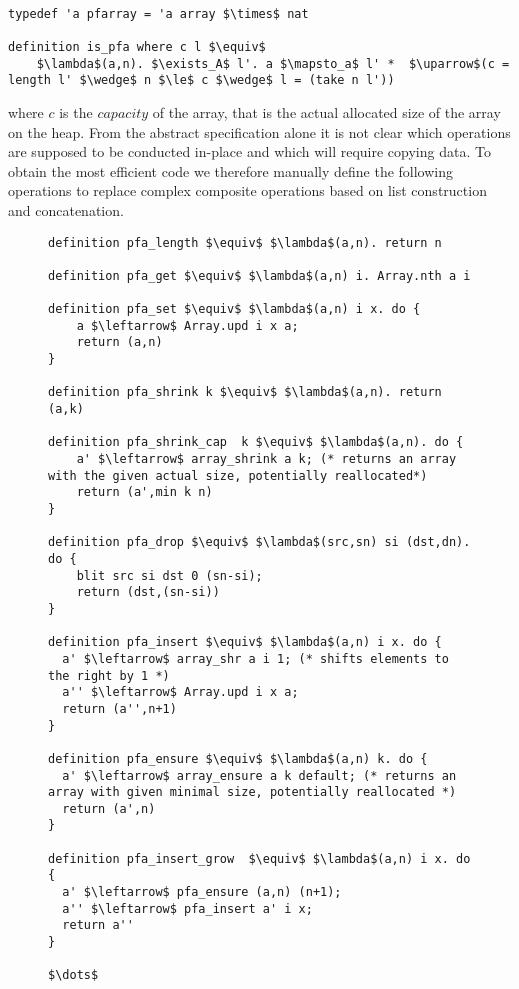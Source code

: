 \begin{lstlisting}[mathescape=true, language=Isabelle]

typedef 'a pfarray = 'a array $\times$ nat

definition is_pfa where c l $\equiv$
    $\lambda$(a,n). $\exists_A$ l'. a $\mapsto_a$ l' *  $\uparrow$(c = length l' $\wedge$ n $\le$ c $\wedge$ l = (take n l'))
\end{lstlisting}

where $c$ is the $capacity$ of the array, that is the actual allocated size
of the array on the heap.
From the abstract specification alone
it is not clear which operations are supposed to be conducted
in-place and which will require copying data.
To obtain the most efficient code we therefore manually
define the following operations to replace complex composite
operations based on list construction and concatenation.

\begin{figure}
\begin{lstlisting}[mathescape=true, language=Isabelle,label={lst:pfarray-def},
    caption={Important Partially Filled Array functions for Insertion.}]
definition pfa_length $\equiv$ $\lambda$(a,n). return n

definition pfa_get $\equiv$ $\lambda$(a,n) i. Array.nth a i

definition pfa_set $\equiv$ $\lambda$(a,n) i x. do {
    a $\leftarrow$ Array.upd i x a;
    return (a,n)
}

definition pfa_shrink k $\equiv$ $\lambda$(a,n). return (a,k)

definition pfa_shrink_cap  k $\equiv$ $\lambda$(a,n). do {
    a' $\leftarrow$ array_shrink a k; (* returns an array with the given actual size, potentially reallocated*)
    return (a',min k n)
}

definition pfa_drop $\equiv$ $\lambda$(src,sn) si (dst,dn). do {
    blit src si dst 0 (sn-si);
    return (dst,(sn-si))
}

definition pfa_insert $\equiv$ $\lambda$(a,n) i x. do {
  a' $\leftarrow$ array_shr a i 1; (* shifts elements to the right by 1 *)
  a'' $\leftarrow$ Array.upd i x a;
  return (a'',n+1)
}

definition pfa_ensure $\equiv$ $\lambda$(a,n) k. do {
  a' $\leftarrow$ array_ensure a k default; (* returns an array with given minimal size, potentially reallocated *)
  return (a',n)
}

definition pfa_insert_grow  $\equiv$ $\lambda$(a,n) i x. do {
  a' $\leftarrow$ pfa_ensure (a,n) (n+1);
  a'' $\leftarrow$ pfa_insert a' i x;
  return a''
}

$\dots$
\end{lstlisting}
\end{figure}

